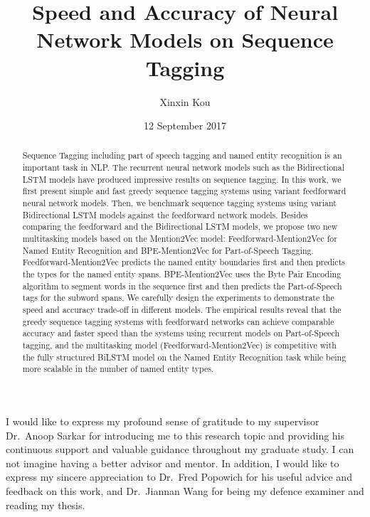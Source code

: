 \documentclass{sfuthesis}
\title{Speed and Accuracy of Neural Network Models on Sequence Tagging}
\author{Xinxin Kou}
\date{12 September 2017}
\newcommand{\ma}{Feedforward-Mention2Vec}
\newcommand{\mb}{BPE-Mention2Vec}
\begin{document}
\frontmatter
\maketitle{}

\begin{abstract}
Sequence Tagging including part of speech tagging and named entity recognition is an important task in NLP. The recurrent neural network models such as the Bidirectional LSTM models have produced impressive results on sequence tagging. In this work, we first present simple and fast greedy sequence tagging systems using variant feedforward neural network models. Then, we benchmark sequence tagging systems using variant Bidirectional LSTM models against the feedforward network models. Besides comparing the feedforward and the Bidirectional LSTM models, we propose two new multitasking models based on the Mention2Vec model: \ma{} for Named Entity Recognition and \mb{} for Part-of-Speech Tagging. \ma{} predicts the named entity boundaries first and then predicts the types for the named entity spans. \mb{} uses the Byte Pair Encoding algorithm to segment words in the sequence first and then predicts the Part-of-Speech tags for the subword spans. We carefully design the experiments to demonstrate the speed and accuracy trade-off in different models. The empirical results reveal that the greedy sequence tagging systems with feedforward networks can achieve comparable accuracy and faster speed than the systems using recurrent models on Part-of-Speech tagging, and the multitasking model (\ma) is competitive with the fully structured BiLSTM model on the Named Entity Recognition task while being more scalable in the number of named entity types.

\end{abstract}


\begin{acknowledgements} %

I would like to express my profound sense of gratitude to my supervisor Dr.\ Anoop Sarkar for introducing me to this research
topic and providing his continuous support and valuable guidance throughout my graduate study. I can not imagine having a better advisor and mentor. In addition, I would like to express my sincere appreciation to Dr.\ Fred Popowich for his useful advice and feedback on this work, and Dr.\ Jiannan Wang for being my defence examiner and reading my thesis.




\end{acknowledgements}
\end{document}
